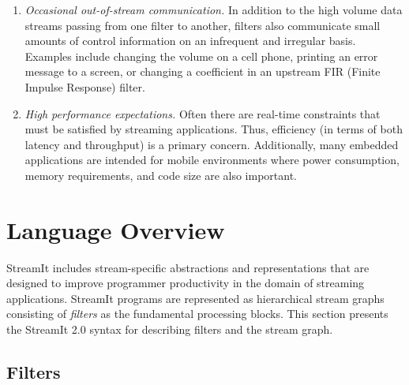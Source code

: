 \documentclass[final]{ijpp}
\begin{document}
\begin{enumerate}
\item \emph{Occasional out-of-stream communication.}  In addition to
  the  high volume data streams  passing from  one filter  to another,
  filters also communicate small  amounts of control information on an
  infrequent  and  irregular  basis.   Examples include  changing  the
  volume on  a cell phone, printing  an error message to  a screen, or
  changing a coefficient in an upstream FIR (Finite Impulse Response) filter.
  
\item \emph{High performance expectations.}  Often there are real-time
  constraints that must be  satisfied by streaming applications. Thus,
  efficiency (in  terms of both  latency and throughput) is  a primary
  concern.  Additionally, many  embedded applications are intended for
  mobile  environments where  power consumption,  memory requirements,
  and code size are also important.
\end{enumerate}


\section{Language Overview}
\label{sec:overview}

StreamIt  includes  stream-specific  abstractions and  representations
that are designed to improve programmer productivity in the domain of
streaming   applications.   StreamIt   programs  are   represented  as
hierarchical  stream  graphs   consisting  of  \emph{filters}  as  the
fundamental processing  blocks. This section
presents the StreamIt 2.0 syntax for describing filters and the stream
graph.

\subsection{Filters}
\end{document}
